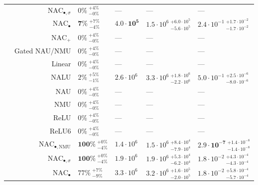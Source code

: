 \begin{longtable}{crllll}
\nopagebreak
 & $\mathrm{NAC}_{\bullet,\sigma}$ & $0\% {~}^{+4\%}_{-0\%}$ & --- & --- & ---\\

\nopagebreak
 & $\mathrm{NAC}_{\bullet}$ & $\mathbf{7\%} {~}^{+7\%}_{-4\%}$ & $\mathbf{4.0 \cdot 10^{5}}$ & $1.5 \cdot 10^{6} {~}^{+6.0 \cdot 10^{5}}_{-5.6 \cdot 10^{5}}$ & $2.4 \cdot 10^{-1} {~}^{+1.7 \cdot 10^{-2}}_{-1.7 \cdot 10^{-2}}$\\

\nopagebreak
 & $\mathrm{NAC}_{+}$ & $0\% {~}^{+4\%}_{-0\%}$ & --- & --- & ---\\

\nopagebreak
 & Gated NAU/NMU & $0\% {~}^{+4\%}_{-0\%}$ & --- & --- & ---\\

\nopagebreak
 & Linear & $0\% {~}^{+4\%}_{-0\%}$ & --- & --- & ---\\

\nopagebreak
 & NALU & $2\% {~}^{+5\%}_{-1\%}$ & $2.6 \cdot 10^{6}$ & $3.3 \cdot 10^{6} {~}^{+1.8 \cdot 10^{6}}_{-2.2 \cdot 10^{6}}$ & $5.0 \cdot 10^{-1} {~}^{+2.5 \cdot 10^{-6}}_{-8.0 \cdot 10^{-6}}$\\

\nopagebreak
 & NAU & $0\% {~}^{+4\%}_{-0\%}$ & --- & --- & ---\\

\nopagebreak
 & NMU & $0\% {~}^{+4\%}_{-0\%}$ & --- & --- & ---\\

\nopagebreak
 & ReLU & $0\% {~}^{+4\%}_{-0\%}$ & --- & --- & ---\\

\nopagebreak
\multirow{-11}{*}{\centering\arraybackslash $\sqrt{z}$} & ReLU6 & $0\% {~}^{+4\%}_{-0\%}$ & --- & --- & ---\\
\cmidrule{1-6}
 & $\mathrm{NAC}_{\bullet,\mathrm{NMU}}$ & $\mathbf{100\%} {~}^{+0\%}_{-4\%}$ & $1.4 \cdot 10^{6}$ & $1.5 \cdot 10^{6} {~}^{+8.4 \cdot 10^{4}}_{-7.9 \cdot 10^{4}}$ & $\mathbf{2.9 \cdot 10^{-7}} {~}^{+1.4 \cdot 10^{-8}}_{-1.4 \cdot 10^{-8}}$\\

\nopagebreak
 & $\mathrm{NAC}_{\bullet,\sigma}$ & $\mathbf{100\%} {~}^{+0\%}_{-4\%}$ & $1.9 \cdot 10^{6}$ & $1.9 \cdot 10^{6} {~}^{+5.3 \cdot 10^{4}}_{-6.2 \cdot 10^{4}}$ & $1.8 \cdot 10^{-2} {~}^{+4.3 \cdot 10^{-4}}_{-4.3 \cdot 10^{-4}}$\\

\nopagebreak
 & $\mathrm{NAC}_{\bullet}$ & $77\% {~}^{+7\%}_{-9\%}$ & $3.3 \cdot 10^{6}$ & $3.2 \cdot 10^{6} {~}^{+1.6 \cdot 10^{5}}_{-2.0 \cdot 10^{5}}$ & $1.8 \cdot 10^{-2} {~}^{+5.8 \cdot 10^{-4}}_{-5.7 \cdot 10^{-4}}$\\


\end{longtable}
